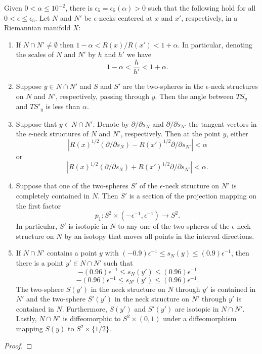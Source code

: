 \begin{proposition}
Given $0<\alpha\le 10^{-2}$, there is
$\epsilon_5=\epsilon_5(\alpha)>0$ such that the following hold for
all $0<\epsilon\le \epsilon_5$. Let $N$ and $N'$ be $\epsilon$-necks
centered at $x$ and $x'$, respectively, in a Riemannian manifold
$X$:
\begin{enumerate}
\item[(1)] If $N\cap N'\not=\emptyset$ then
$1-\alpha<R(x)/R(x')<1+\alpha$. In particular, denoting the scales
of $N$ and $N'$ by $h$ and $h'$ we have
$$1-\alpha<\frac{h}{h'}<1+\alpha.$$
\item[(2)] Suppose $y\in N\cap N'$ and $S$ and $S'$ are the two-spheres in the $\epsilon$-neck
structures on $N$ and $N'$, respectively, passing through $y$. Then
the angle between $TS_y$ and $TS'_y$ is less than $\alpha$.
\item[(3)] Suppose that $y\in N\cap N'$. Denote by $\partial/\partial s_N$ and $\partial/\partial s_{N'}$
the tangent vectors in the $\epsilon$-neck structures of $N$ and
$N'$, respectively. Then at the point $y$, either
$$|R(x)^{1/2}(\partial /\partial s_N)-R(x')^{1/2}\partial/\partial s_{N'}|<\alpha$$
or
$$|R(x)^{1/2}(\partial /\partial s_N)+R(x')^{1/2}\partial/\partial s_{N'}|<\alpha.$$
 \item[(4)] Suppose that
one of the two-spheres $S'$ of the $\epsilon$-neck structure on $N'$
is completely contained in $N$. Then $S'$ is a section of the
projection mapping on the first factor
$$p_1\colon S^2\times(-\epsilon^{-1},\epsilon^{-1})\to S^2.$$
In particular, $S'$ is isotopic in $N$ to any one of the two-spheres
of the $\epsilon$-neck structure on $N$ by an isotopy that moves all
points in the interval directions.
\item[(5)] If $N\cap N'$ contains a point $y$ with $(-0.9)\epsilon^{-1}\le s_N(y)\le
(0.9)\epsilon^{-1}$, then there is a point $y'\in N\cap N'$ such
that
$$-(0.96)\epsilon^{-1}\le s_N(y')\le (0.96)\epsilon^{-1}$$
$$-(0.96)\epsilon^{-1}\le s_{N'}(y')\le (0.96)\epsilon^{-1}.$$
The two-sphere $S(y')$ in the neck structure on $N$ through $y'$ is contained
in $N'$ and the two-sphere $S'(y')$ in the neck structure on $N'$ through $y'$
is contained in $N$. Furthermore, $S(y')$ and $S'(y')$ are isotopic in $N\cap
N'$. Lastly, $N\cap N'$ is diffeomorphic to $S^2\times (0,1)$ under a
diffeomorphism mapping $S(y)$ to $S^2\times \{1/2\}$.
\end{enumerate}
\end{proposition}


\begin{proof}
\sketch
{}
\end{proof}






